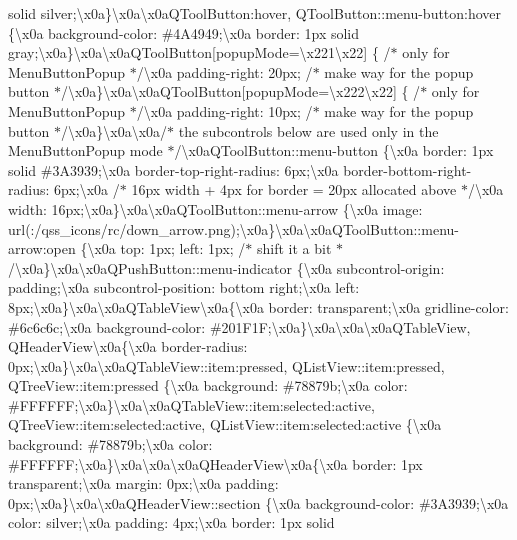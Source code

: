 solid silver;\textbackslash{}x0a\}\textbackslash{}x0a\textbackslash{}x0a\+Q\+Tool\+Button\+:hover, Q\+Tool\+Button\+::menu-\/button\+:hover \{\textbackslash{}x0a background-\/color\+: \#4\+A4949;\textbackslash{}x0a border\+: 1px solid gray;\textbackslash{}x0a\}\textbackslash{}x0a\textbackslash{}x0a\+Q\+Tool\+Button\mbox{[}popup\+Mode=\textbackslash{}x221\textbackslash{}x22\mbox{]} \{ /$\ast$ only for Menu\+Button\+Popup $\ast$/\textbackslash{}x0a padding-\/right\+: 20px; /$\ast$ make way for the popup button $\ast$/\textbackslash{}x0a\}\textbackslash{}x0a\textbackslash{}x0a\+Q\+Tool\+Button\mbox{[}popup\+Mode=\textbackslash{}x222\textbackslash{}x22\mbox{]} \{ /$\ast$ only for Menu\+Button\+Popup $\ast$/\textbackslash{}x0a padding-\/right\+: 10px; /$\ast$ make way for the popup button $\ast$/\textbackslash{}x0a\}\textbackslash{}x0a\textbackslash{}x0a/$\ast$ the subcontrols below are used only in the Menu\+Button\+Popup mode $\ast$/\textbackslash{}x0a\+Q\+Tool\+Button\+::menu-\/button \{\textbackslash{}x0a border\+: 1px solid \#3\+A3939;\textbackslash{}x0a border-\/top-\/right-\/radius\+: 6px;\textbackslash{}x0a border-\/bottom-\/right-\/radius\+: 6px;\textbackslash{}x0a /$\ast$ 16px width + 4px for border = 20px allocated above $\ast$/\textbackslash{}x0a width\+: 16px;\textbackslash{}x0a\}\textbackslash{}x0a\textbackslash{}x0a\+Q\+Tool\+Button\+::menu-\/arrow \{\textbackslash{}x0a image\+: url(\+:/qss\+\_\+icons/rc/down\+\_\+arrow.\+png);\textbackslash{}x0a\}\textbackslash{}x0a\textbackslash{}x0a\+Q\+Tool\+Button\+::menu-\/arrow\+:open \{\textbackslash{}x0a top\+: 1px; left\+: 1px; /$\ast$ shift it a bit $\ast$/\textbackslash{}x0a\}\textbackslash{}x0a\textbackslash{}x0a\+Q\+Push\+Button\+::menu-\/indicator \{\textbackslash{}x0a subcontrol-\/origin\+: padding;\textbackslash{}x0a subcontrol-\/position\+: bottom right;\textbackslash{}x0a left\+: 8px;\textbackslash{}x0a\}\textbackslash{}x0a\textbackslash{}x0a\+Q\+Table\+View\textbackslash{}x0a\{\textbackslash{}x0a border\+: transparent;\textbackslash{}x0a gridline-\/color\+: \#6c6c6c;\textbackslash{}x0a background-\/color\+: \#201\+F1\+F;\textbackslash{}x0a\}\textbackslash{}x0a\textbackslash{}x0a\textbackslash{}x0a\+Q\+Table\+View, Q\+Header\+View\textbackslash{}x0a\{\textbackslash{}x0a border-\/radius\+: 0px;\textbackslash{}x0a\}\textbackslash{}x0a\textbackslash{}x0a\+Q\+Table\+View\+::item\+:pressed, Q\+List\+View\+::item\+:pressed, Q\+Tree\+View\+::item\+:pressed \{\textbackslash{}x0a background\+: \#78879b;\textbackslash{}x0a color\+: \#\+F\+F\+F\+F\+F\+F;\textbackslash{}x0a\}\textbackslash{}x0a\textbackslash{}x0a\+Q\+Table\+View\+::item\+:selected\+:active, Q\+Tree\+View\+::item\+:selected\+:active, Q\+List\+View\+::item\+:selected\+:active \{\textbackslash{}x0a background\+: \#78879b;\textbackslash{}x0a color\+: \#\+F\+F\+F\+F\+F\+F;\textbackslash{}x0a\}\textbackslash{}x0a\textbackslash{}x0a\textbackslash{}x0a\+Q\+Header\+View\textbackslash{}x0a\{\textbackslash{}x0a border\+: 1px transparent;\textbackslash{}x0a margin\+: 0px;\textbackslash{}x0a padding\+: 0px;\textbackslash{}x0a\}\textbackslash{}x0a\textbackslash{}x0a\+Q\+Header\+View\+::section \{\textbackslash{}x0a background-\/color\+: \#3\+A3939;\textbackslash{}x0a color\+: silver;\textbackslash{}x0a padding\+: 4px;\textbackslash{}x0a border\+: 1px solid 